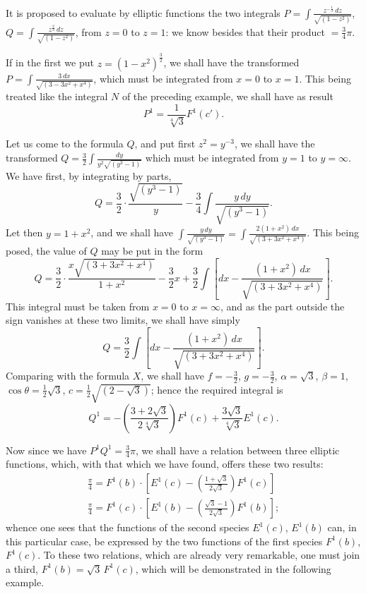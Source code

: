 \documentclass{article}
\begin{document}
It is proposed to evaluate by elliptic functions the two integrals $P=\displaystyle\int\frac{z^{-\frac{1}{3}}\,dz}{\sqrt{(1-z^{2})}}$, $Q=\displaystyle\int\frac{z^{\frac{2}{3}}\,dz}{\sqrt{(1-z^{2})}}$, from $z=0$ to $z=1$: we know besides that their product $=\frac{3}{4}\pi$.

If in the first we put $z=(1-x^{2})^{\frac{3}{2}}$, we shall have the transformed $P=\displaystyle\int\frac{3\,dx}{\sqrt{(3-3x^{2}+x^{4})}}$, which must be integrated from $x=0$ to $x=1$. This being treated like the integral $N$ of the preceding example, we shall have as result
\[ P^{1}=\frac{1}{\sqrt[4]{3}}F^{1}(c'). \]

Let us come to the formula $Q$, and put first $z^{2}=y^{-3}$, we shall have the transformed $Q=\frac{3}{2}\displaystyle\int\frac{dy}{y^{2}\sqrt{(y^{3}-1)}}$ which must be integrated from $y=1$ to $y=\infty$. We have first, by integrating by parts,
\[ Q=\frac{3}{2}\cdot\frac{\sqrt{(y^{3}-1)}}{y}-\frac{3}{4}\int\frac{y\,dy}{\sqrt{(y^{3}-1)}}. \]
Let then $y=1+x^{2}$, and we shall have $\displaystyle\int\frac{y\,dy}{\sqrt{(y^{3}-1)}}=\displaystyle\int\frac{2(1+x^{2})\,dx}{\sqrt{(3+3x^{2}+x^{4})}}$. This being posed, the value of $Q$ may be put in the form
\[ Q=\frac{3}{2}\cdot\frac{x\sqrt{(3+3x^{2}+x^{4})}}{1+x^{2}}-\frac{3}{2}x+\frac{3}{2}\int\left[dx-\frac{(1+x^{2})\,dx}{\sqrt{(3+3x^{2}+x^{4})}}\right]. \]
This integral must be taken from $x=0$ to $x=\infty$, and as the part outside the sign vanishes at these two limits, we shall have simply
\[ Q=\frac{3}{2}\int\left[dx-\frac{(1+x^{2})\,dx}{\sqrt{(3+3x^{2}+x^{4})}}\right]. \]
Comparing with the formula $X$, we shall have $f=-\frac{3}{2}$, $g=-\frac{3}{2}$, $\alpha=\sqrt{3}$, $\beta=1$, $\cos\theta=\frac{1}{2}\sqrt{3}$, $c=\frac{1}{2}\sqrt{(2-\sqrt{3})}$; hence the required integral is
\[ Q^{1}=-\left(\frac{3+2\sqrt{3}}{2\sqrt[4]{3}}\right)F^{1}(c)+\frac{3\sqrt{3}}{\sqrt[4]{3}}E^{1}(c). \]

Now since we have $P^{1}Q^{1}=\frac{3}{4}\pi$, we shall have a relation between three elliptic functions, which, with that which we have found, offers these two results:
\[ \begin{gathered} \frac{\pi}{4}=F^{1}(b)\cdot\left[E^{1}(c)-\left(\frac{1+\sqrt{3}}{2\sqrt{3}}\right)F^{1}(c)\right]\\ \frac{\pi}{4}=F^{1}(c)\cdot\left[E^{1}(b)-\left(\frac{\sqrt{3}-1}{2\sqrt{3}}\right)F^{1}(b)\right]; \end{gathered} \]
whence one sees that the functions of the second species $E^{1}(c)$, $E^{1}(b)$ can, in this particular case, be expressed by the two functions of the first species $F^{1}(b)$, $F^{1}(c)$. To these two relations, which are already very remarkable, one must join a third, $F^{1}(b)=\sqrt{3}\,F^{1}(c)$, which will be demonstrated in the following example.
\end{document}
